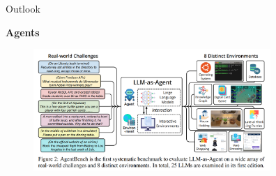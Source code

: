
\begin{vbframe}{Outlook}

\vfill

\textbf{Agents}

\begin{figure}
	\centering
		\includegraphics[width = 9cm]{figure/agent-bench.png}\\ 
\end{figure}
	
\vfill

\end{vbframe}


\endlecture
